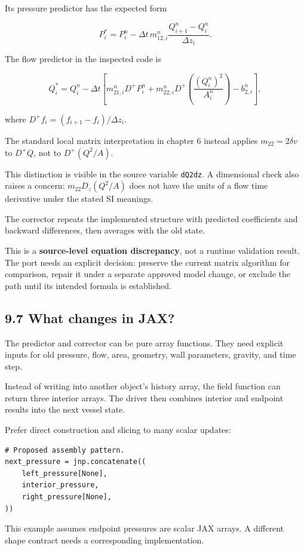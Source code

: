\documentclass[11pt,a4paper]{article}
\begin{document}
Its pressure predictor has the expected form


\begingroup\small
\[
P_i^*=P_i^n
-\Delta t\,m_{12,i}^n
\frac{Q_{i+1}^n-Q_i^n}{\Delta z_i}.
\]
\endgroup


The flow predictor in the inspected code is


\begingroup\small
\[
Q_i^*=Q_i^n-\Delta t\left[
m_{21,i}^n D^+P_i^n
+m_{22,i}^n D^+\left(\frac{(Q_i^n)^2}{A_i^n}\right)
-b_{2,i}^n
\right],
\]
\endgroup


where \(D^+f_i=(f_{i+1}-f_i)/\Delta z_i\).

The standard local matrix interpretation in chapter 6 instead applies \(m_{22}=2\delta v\) to \(D^+Q\), not to \(D^+(Q^2/A)\).

This distinction is visible in the source variable \texttt{dQ2dz}. A dimensional check also raises a concern: \(m_{22}D_z(Q^2/A)\) does not have the units of a flow time derivative under the stated SI meanings.

The corrector repeats the implemented structure with predicted coefficients and backward differences, then averages with the old state.

This is a \textbf{source-level equation discrepancy}, not a runtime validation result. The port needs an explicit decision: preserve the current matrix algorithm for comparison, repair it under a separate approved model change, or exclude the path until its intended formula is established.

\subsection{9.7 What changes in JAX?}
The predictor and corrector can be pure array functions. They need explicit inputs for old pressure, flow, area, geometry, wall parameters, gravity, and time step.

Instead of writing into another object's history array, the field function can return three interior arrays. The driver then combines interior and endpoint results into the next vessel state.

Prefer direct construction and slicing to many scalar updates:


\begin{lstlisting}
# Proposed assembly pattern.
next_pressure = jnp.concatenate((
    left_pressure[None],
    interior_pressure,
    right_pressure[None],
))
\end{lstlisting}
This example assumes endpoint pressures are scalar JAX arrays. A different shape contract needs a corresponding implementation.
\end{document}
